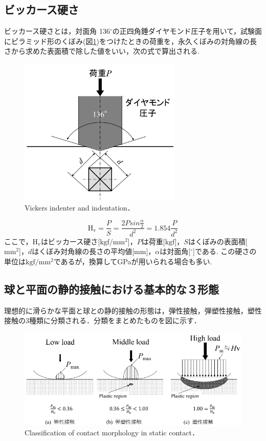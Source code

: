 \subsection{ビッカース硬さ}
ビッカース硬さとは，対面角 136$^\circ$の正四角錘ダイヤモンド圧子を用いて，試験面にピラミッド形のくぼみ(図\ref{fig:ビッカース硬さ})をつけたときの荷重を，永久くぼみの対角線の長さから求めた表面積で除した値をいい，次の式で算出される.
\begin{figure}[htbp]
    \centering %
    \includegraphics[width=100truemm,clip]{fig/fig_ビッカース硬さ.png}
    \caption{Vickers indenter and indentation．}
    \label{fig:ビッカース硬さ}
\end{figure}
\begin{equation}
    \label{eq:ビッカース硬さ}
    \mathrm{H_v} = \frac{P}{S} = \frac{2Psin \frac{\alpha}{2}}{d^2} = 1.854\frac{P}{d^2}
\end{equation}
ここで，$\mathrm{H_v}$はビッカース硬さ[$\mathrm{kgf/mm^2}$]，$P$は荷重[$\mathrm{kgf}$]，$S$はくぼみの表面積[$\mathrm{mm^2}$]，$d$はくぼみ対角線の長さの平均値[mm]，$\alpha$は対面角[$^\circ$]である. この硬さの単位は$\mathrm{kgf/mm^2}$であるが，換算してGPaが用いられる場合も多い.

\subsection{球と平面の静的接触における基本的な３形態}
理想的に滑らかな平面と球との静的接触の形態は，弾性接触，弾塑性接触，塑性接触の3種類に分類される．分類をまとめたものを図に示す．

\begin{figure}[htbp]
    \centering %
    \includegraphics[width=100truemm,clip]{fig/fig_接触形態の分類.png}
    \caption{Classification of contact morphology in static contact．}
    \label{fig:接触形態}
\end{figure}

